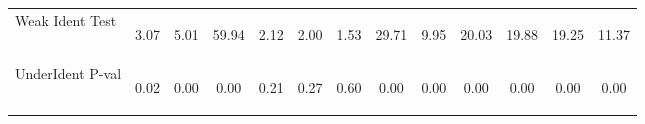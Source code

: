 \begin{center}
\begin{tabular}{lcccccccccccc}
Weak Ident Test  & \begin{normalsize}3.07\end{normalsize} & \begin{normalsize}5.01\end{normalsize} & \begin{normalsize}59.94\end{normalsize} & \begin{normalsize}2.12\end{normalsize} & \begin{normalsize}2.00\end{normalsize} & \begin{normalsize}1.53\end{normalsize} & \begin{normalsize}29.71\end{normalsize} & \begin{normalsize}9.95\end{normalsize} & \begin{normalsize}20.03\end{normalsize} & \begin{normalsize}19.88\end{normalsize} & \begin{normalsize}19.25\end{normalsize} & \begin{normalsize}11.37\end{normalsize}\\
UnderIdent P-val & \begin{normalsize}0.02\end{normalsize} & \begin{normalsize}0.00\end{normalsize} & \begin{normalsize}0.00\end{normalsize} & \begin{normalsize}0.21\end{normalsize} & \begin{normalsize}0.27\end{normalsize} & \begin{normalsize}0.60\end{normalsize} & \begin{normalsize}0.00\end{normalsize} & \begin{normalsize}0.00\end{normalsize} & \begin{normalsize}0.00\end{normalsize} & \begin{normalsize}0.00\end{normalsize} & \begin{normalsize}0.00\end{normalsize} & \begin{normalsize}0.00\end{normalsize}\\

\end{tabular}
\end{center}

